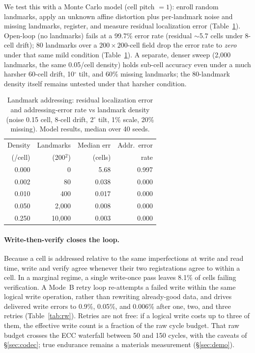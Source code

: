 \documentclass[letterpaper,twocolumn,10pt]{article}
\begin{document}
We test this with a Monte Carlo model (cell pitch $=1$): enroll random landmarks,
apply an unknown affine distortion plus per-landmark noise and missing landmarks,
register, and measure residual localization error (Table~\ref{tab:landmarks}).
Open-loop (no landmarks) fails at a 99.7\% error rate (residual $\sim$5.7 cells under
8-cell drift); 80 landmarks over a $200\times200$-cell field drop the error rate to
\emph{zero} under that same mild condition (Table~\ref{tab:landmarks}). A separate,
denser sweep (2{,}000 landmarks, the same 0.05/cell density) holds sub-cell accuracy
even under a much harsher 60-cell drift, 10$^\circ$ tilt, and 60\% missing landmarks;
the 80-landmark density itself remains untested under that harsher condition.

\begin{table}[t]\centering\small
\setlength{\tabcolsep}{4pt}
\caption{Landmark addressing: residual localization error and addressing-error rate
vs landmark density (noise 0.15 cell, 8-cell drift, 2$^\circ$ tilt, 1\% scale, 20\%
missing). Model results, median over 40 seeds.}
\label{tab:landmarks}
\begin{tabular}{rrrr}
\toprule
Density & Landmarks & Median err & Addr.\ error \\
(/cell) & (200$^2$) & (cells) & rate \\
\midrule
0.000 & 0 & 5.68 & 0.997 \\
0.002 & 80 & 0.038 & 0.000 \\
0.010 & 400 & 0.017 & 0.000 \\
0.050 & 2{,}000 & 0.008 & 0.000 \\
0.250 & 10{,}000 & 0.003 & 0.000 \\
\bottomrule
\end{tabular}
\end{table}

\paragraph{Write-then-verify closes the loop.} Because a cell is addressed
relative to the same imperfections at write and read time, write and verify agree
whenever their two registrations agree to within a cell. In a marginal regime, a
single write-once pass leaves 8.1\% of cells failing verification.  A Mode~B retry loop
re-attempts a failed write within the same logical write operation, rather than
rewriting already-good data, and drives delivered write errors to 0.9\%, 0.05\%, and
0.006\% after one, two, and three retries (Table~\ref{tab:rw}).  Retries are not free:
if a logical write costs up to three of them, the effective write count is a fraction of
the raw cycle budget.  That raw budget crosses the ECC waterfall between 50 and 150
cycles, with the caveats of \S\ref{sec:codec}; true endurance remains a materials
measurement (\S\ref{sec:demo}).
\end{document}
